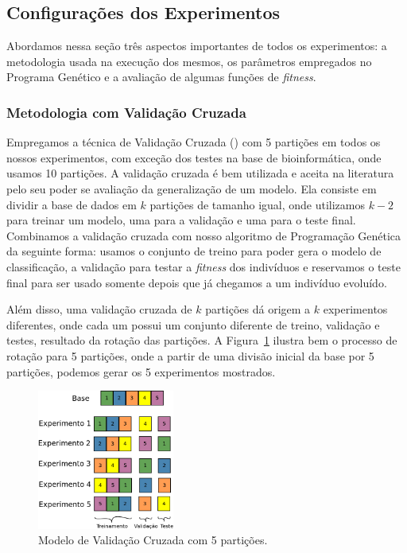 
\subsection{Configurações dos Experimentos}
\label{subsec::config}

Abordamos nessa seção três aspectos importantes de todos os experimentos: a metodologia usada na execução dos mesmos, os parâmetros empregados no Programa Genético e 
a avaliação de algumas funções de \textit{fitness}.

\subsubsection{Metodologia com Validação Cruzada}
\label{subsubsec::cv}

Empregamos a técnica de Validação Cruzada (\cite{Refaeilzadeh00}) com 5 partições em todos os nossos experimentos, com exceção dos testes na base de bioinformática, onde usamos 10 partições.
A validação cruzada é bem utilizada e aceita na literatura pelo seu poder se avaliação da generalização de um modelo. Ela consiste em dividir a base de dados em $k$ partições de tamanho igual, onde utilizamos $k-2$ para treinar um modelo, uma para a validação e uma para o teste final. 
Combinamos a validação cruzada com nosso algoritmo de Programação Genética da seguinte forma: usamos o conjunto de treino para poder gera o modelo de classificação, a validação para testar a \textit{fitness} dos indivíduos e reservamos o teste final para ser usado somente depois que já chegamos a um indivíduo evoluído. 

Além disso, uma validação cruzada de $k$ partições dá origem a $k$ experimentos diferentes, onde cada um possui um conjunto diferente de treino, validação e testes, resultado da rotação das partições. A Figura~\ref{fig::cv} ilustra bem o processo de rotação para 5 partições, onde a partir de uma divisão inicial da base por 5 partições, podemos gerar os 5 experimentos mostrados.

\begin{figure}[h!]
  \centering
  \includegraphics[width=0.40\textwidth]{figures/cv.png}
 \caption{Modelo de Validação Cruzada com 5 partições.}
\label{fig::cv}
\end{figure}

